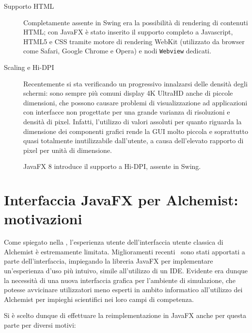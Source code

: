 \begin{description}
                \item[Supporto HTML]\label{itm:html} Completamente assente in Swing era la possibilità di rendering di contenuti HTML; con JavaFX è stato inserito il supporto completo a Javascript, HTML5 e CSS tramite motore di rendering WebKit (utilizzato da browser come Safari, Google Chrome e Opera) e nodi \texttt{Webview} dedicati.

                \item[Scaling e Hi-DPI]\label{itm:hidpi} Recentemente si sta verificando un progressivo innalzarsi delle densità degli schermi: sono sempre più comuni display 4K UltraHD anche di piccole dimensioni, che possono causare problemi di visualizzazione ad applicazioni con interfacce non progettate per una grande varianza di risoluzioni e densità di pixel.
                Infatti, l'utilizzo di valori assoluti per quanto riguarda la dimensione dei componenti grafici rende la GUI molto piccola e soprattutto quasi totalmente inutilizzabile dall’utente, a causa dell'elevato rapporto di pixel per unità di dimensione.

                JavaFX 8 introduce il supporto a Hi-DPI, assente in Swing.
            \end{description}

    \section{Interfaccia JavaFX per Alchemist: motivazioni}\label{sec:motivi}
        Come spiegato nella , l'esperienza utente dell'interfaccia utente classica di Alchemist è estremamente limitata.
        Miglioramenti recenti~\cite{casadio} sono stati apportati a parte dell'interfaccia, impiegando la libreria JavaFX per implementare un'esperienza d'uso più intuivo, simile all'utilizzo di un IDE.
        Evidente era dunque la necessità di una nuova interfaccia grafica per l'ambiente di simulazione, che potesse avvicinare utilizzatori meno esperti in ambito informatico all'utilizzo dei Alchemist per impieghi scientifici nei loro campi di competenza.

        Si è scelto dunque di effettuare la reimplementazione in JavaFX anche per questa parte per diversi motivi:

